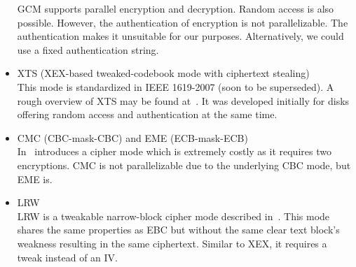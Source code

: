 \begin{itemize}
	GCM supports parallel encryption and decryption. Random access is also possible. However, the authentication of encryption is not parallelizable. The authentication makes it unsuitable for our purposes. Alternatively, we could use a fixed authentication string.
	\item XTS (XEX-based tweaked-codebook mode with ciphertext stealing)\\
	This mode is standardized in IEEE 1619-2007 (soon to be superseded). A rough overview of XTS may be found at~\cite{Martin2010}. It was developed initially for disks offering random access and authentication at the same time. 
	\item CMC (CBC-mask-CBC) and EME (ECB-mask-ECB)\\ 
	In~\cite{Halevi:2003} \citeauthor{Halevi:2003} introduces a cipher mode which is extremely costly as it requires two encryptions. CMC is not parallelizable due to the underlying CBC mode, but EME is. 
	\item LRW\\
	LRW is a tweakable narrow-block cipher mode described in~\cite{tschorsch:translayeranon}. This mode shares the same properties as EBC but without the same clear text block's weakness resulting in the same ciphertext. Similar to XEX, it requires a tweak instead of an IV.
\end{itemize}

